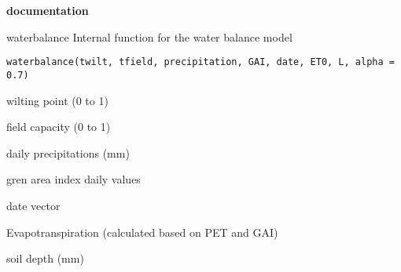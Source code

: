 \documentclass[a4paper]{book}
\begin{document}
\chapter*{}
\begin{center}
{\textbf{\huge \R{} documentation}} \par{}
\par\bigskip{\large \today}
\end{center}
%
\begin{Description}\relax
waterbalance
Internal function for the water balance model
\end{Description}
%
\begin{Usage}
\begin{verbatim}
waterbalance(twilt, tfield, precipitation, GAI, date, ET0, L, alpha = 0.7)
\end{verbatim}
\end{Usage}
%
\begin{Arguments}
\begin{ldescription}
\item[\code{twilt}] wilting point (0 to 1)

\item[\code{tfield}] field capacity (0 to 1)

\item[\code{precipitation}] daily precipitations (mm)

\item[\code{GAI}] gren area index daily values

\item[\code{date}] date vector

\item[\code{ET0}] Evapotranspiration (calculated based on PET and GAI)

\item[\code{L}] soil depth (mm)
\end{ldescription}
\end{Arguments}
%
\end{document}
